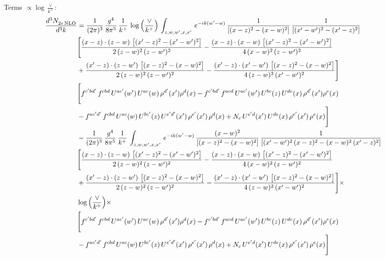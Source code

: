 \documentclass[10pt]{article}
\numberwithin{equation}{section}
\begin{document}
\noindent Terms $\propto\log\frac{\vee}{k^+}$:
\begin{align}
 \frac{d^{3}N_{2e\,\rm NLO}^{\rm}}{d^{3}k}  & =  \frac{1}{(2\pi)^{3}}\, \frac{g^{4}}{8\pi^{5}}\,\frac{1}{k^{+}}\,\log{\left(\frac{\vee}{k^{+}}\right)}\,\int_{z,w,w^{\prime},x,x'}\, e^{-ik(w^{\prime}-w)}\, \frac{1}{\left[(x-z)^{2}-(x-w)^{2}\right]}\, \frac{1}{\left[(x'-w')^{2} - (x'-z)^{2}\right]} \notag \\ & \Bigg[\frac{(x-z)\cdot (z-w)\, \left[(x'-z)^{2}-(x'-w')^{2}\right]}{2\, (z-w)^{2}\, (z-w')^{2}}  - \frac{(x-z)\cdot (x-w)\,\left[(x'-z)^{2}-(x'-w')^{2}\right] }{4\,(x-w)^{2}\,(z-w')^{2}}\notag \\ & +\frac{(x'-z)\cdot (z-w')\, \left[(x-z)^{2}-(x-w)^{2}\right]}{2\, (z-w)^{2}\, (z-w')^{2}}-\frac{(x'-z)\cdot (x'-w')\, \left[(x-z)^{2}-(x-w)^{2}\right]}{4\, (z-w)^{2}\,(x'-w')^{2}}\Bigg]\notag \\ & \Bigg[f^{c'bd'}\,f^{cbd}\, U^{ac'}(w')\,U^{ac}(w)\,\rho^{d'}(x')\rho^{d}(x)- f^{c'bd'}\,f^{acd}\,U^{ac'}(w')\,U^{bc}(z)\,U^{de}(x)\,\rho^{d'}(x')\rho^{e}(x) \notag \\ & -f^{ac'd'}\,f^{cbd}\,U^{ac}(w)\,U^{bc'}(z)\,U^{e'd'}(x')\,\rho^{e'}(x')\,\rho^{d}(x) +N_{c}\,U^{e'd}(x')\,U^{de}(x)\,\rho^{e'}(x')\,\rho^{e}(x)\Bigg] \notag \\
& -\frac{1}{(2\pi)^{3}}\, \frac{g^{4}}{8\pi^{5}}\,\frac{1}{k^{+}}\,\int_{z,w,w^{\prime},x,x'}\, e^{-ik(w^{\prime}-w)}\,\frac{(x-w)^{2}}{\left[(x-z)^{2}-(x-w)^{2}\right]}\, \frac{1}{\left[(x'-w')^{2}\, (x-z)^{2} - (x-w)^{2}\, (x'-z)^{2}\right]} \notag \\ & \Bigg[\frac{(x-z)\cdot (z-w)\, \left[(x'-z)^{2}-(x'-w')^{2}\right]}{2\, (z-w)^{2}\, (z-w')^{2}}  - \frac{(x-z)\cdot (x-w)\,\left[(x'-z)^{2}-(x'-w')^{2}\right] }{4\,(x-w)^{2}\,(z-w')^{2}}\notag \\ & +\frac{(x'-z)\cdot (z-w')\, \left[(x-z)^{2}-(x-w)^{2}\right]}{2\, (z-w)^{2}\, (z-w')^{2}}-\frac{(x'-z)\cdot (x'-w')\, \left[(x-z)^{2}-(x-w)^{2}\right]}{4\, (z-w)^{2}\,(x'-w')^{2}}\Bigg]\times\,\notag \\ & \log{\left(\frac{\vee}{k^{+}}\right)}\times\,\notag \\ & \Bigg[f^{c'bd'}\,f^{cbd}\, U^{ac'}(w')\,U^{ac}(w)\,\rho^{d'}(x')\rho^{d}(x)- f^{c'bd'}\,f^{acd}\,U^{ac'}(w')\,U^{bc}(z)\,U^{de}(x)\,\rho^{d'}(x')\rho^{e}(x) \notag \\ & -f^{ac'd'}\,f^{cbd}\,U^{ac}(w)\,U^{bc'}(z)\,U^{e'd'}(x')\,\rho^{e'}(x')\,\rho^{d}(x) +N_{c}\,U^{e'd}(x')\,U^{de}(x)\,\rho^{e'}(x')\,\rho^{e}(x)\Bigg] \notag \\

\end{align}
\end{document}
